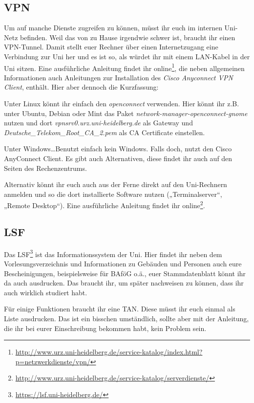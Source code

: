 \subsection{VPN}
Um auf manche Dienste zugreifen zu können, müsst ihr euch im internen Uni-Netz befinden. Weil das von zu Hause irgendwie schwer ist, braucht ihr einen VPN-Tunnel. Damit stellt euer Rechner über einen Internetzugang eine Verbindung zur Uni her und es ist so, als würdet ihr mit einem LAN-Kabel in der Uni sitzen. Eine ausführliche Anleitung findet ihr online\footnote{\url{http://www.urz.uni-heidelberg.de/service-katalog/index.html?p=netzwerkdienste/vpn/}}, die neben allgemeinen Informationen auch Anleitungen zur Installation des \emph{Cisco Anyconnect VPN Client}, enthält. Hier aber dennoch die Kurzfassung:

Unter Linux könnt ihr einfach den \emph{openconnect} verwenden. Hier könnt ihr z.B. unter Ubuntu, Debian oder Mint das Paket \emph{network-manager-openconnect-gnome} nutzen und dort \emph{vpnsrv0.urz.uni-heidelberg.de} als Gateway und \emph{Deutsche\_Telekom\_Root\_CA\_2.pem} als CA Certificate einstellen.

Unter Windows\ldots Benutzt einfach kein Windows. Falls doch, nutzt den Cisco AnyConnect Client. Es gibt auch Alternativen, diese findet ihr auch auf den Seiten des Rechenzentrums.

Alternativ könnt ihr euch auch aus der Ferne direkt auf den Uni-Rechnern anmelden und so die dort installierte Software nutzen („Terminalserver“, „Remote Desktop“). Eine ausführliche Anleitung findet ihr online\footnote{\url{http://www.urz.uni-heidelberg.de/service-katalog/serverdienste/}}.

\subsection{LSF}
Das LSF\footnote{\url{https://lsf.uni-heidelberg.de/}} ist das Informationssystem der Uni. Hier findet ihr neben dem Vorlesungsverzeichnis und Informationen zu Gebäuden und Personen auch eure Bescheinigungen, beispielsweise für BAföG o.ä., euer Stammdatenblatt könnt ihr da auch ausdrucken. Das braucht ihr, um später nachweisen zu können, dass ihr auch wirklich studiert habt.

Für einige Funktionen braucht ihr eine TAN. Diese müsst ihr euch einmal als Liste ausdrucken. Das ist ein bisschen umständlich, sollte aber mit der Anleitung, die ihr bei eurer Einschreibung bekommen habt, kein Problem sein.


